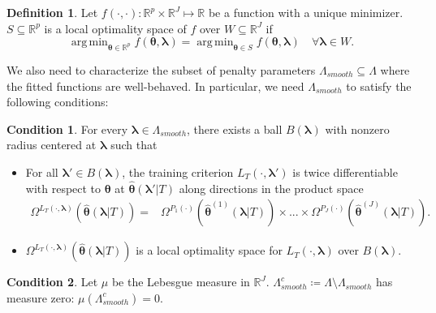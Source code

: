 \documentclass[12pt]{article} %
\theoremstyle{definition}
\newtheorem{definition}{Definition}
\newtheorem{condition}{Condition}
\DeclareMathOperator*{\argmin}{arg\,min}
\begin{document}
\begin{definition}
	Let $f(\cdot, \cdot): \mathbb{R}^p \times \mathbb{R}^J \mapsto \mathbb{R}$ be a function with a unique minimizer.
	$S \subseteq \mathbb{R}^p$ is a local optimality space of $f$ over $W \subseteq \mathbb{R}^J$ if
	\begin{equation}
	\argmin_{\boldsymbol{\theta} \in \mathbb{R}^p} f(\boldsymbol{\theta}, \boldsymbol \lambda) =
	\argmin_{\boldsymbol{\theta} \in S} f(\boldsymbol{\theta}, \boldsymbol \lambda) \quad \forall \boldsymbol \lambda \in W.
	\end{equation}
\end{definition}
We also need to characterize the subset of penalty parameters $\Lambda_{smooth} \subseteq \Lambda$ where the fitted functions are well-behaved.
In particular, we need $\Lambda_{smooth}$ to satisfy the following conditions:
\begin{condition}
	\label{condn:nonsmooth1}
	For every $\boldsymbol{\lambda} \in \Lambda_{smooth}$, there exists a ball $B(\boldsymbol{\lambda})$ with nonzero radius centered at $\boldsymbol{\lambda}$ such that
	\begin{itemize}
		\item For all $\boldsymbol{\lambda}'\in B(\boldsymbol{\lambda})$, the training criterion $L_{T}(\cdot, \boldsymbol{\lambda}')$ is twice differentiable with respect to $\boldsymbol{\theta}$ at $\hat{\boldsymbol{\theta}}(\boldsymbol{\lambda}'|T)$
		along directions in the product space
		\begin{align}
		\Omega^{L_T(\cdot, \boldsymbol{\lambda})} \left (\hat{\boldsymbol \theta}\left(\boldsymbol{\lambda}|T \right) \right) =
		& \Omega^{P_1(\cdot)}
			\left(\hat{\boldsymbol{\theta}}^{(1)}(\boldsymbol{\lambda} | T)\right)
		\times
		...
		\times
		\Omega^{P_J(\cdot)}
		\left(\hat{\boldsymbol{\theta}}^{(J)}(\boldsymbol{\lambda} | T)\right)
		.
		\end{align}
		\item $\Omega^{L_T(\cdot, \boldsymbol{\lambda})} \left (\hat{\boldsymbol \theta}\left(\boldsymbol{\lambda}|T \right) \right)$ is a local optimality space for $L_T\left(\cdot,\boldsymbol{\lambda}\right)$ over $B(\boldsymbol{\lambda})$.
	\end{itemize}
\end{condition}
\begin{condition}
	\label{condn:nonsmooth2}
	Let $\mu$ be the Lebesgue measure in $\mathbb{R}^{J}$.
	$\Lambda_{smooth}^c \coloneqq \Lambda \setminus \Lambda_{smooth}$ has measure zero: $\mu(\Lambda_{smooth}^c) = 0$.
\end{condition}
\end{document}
